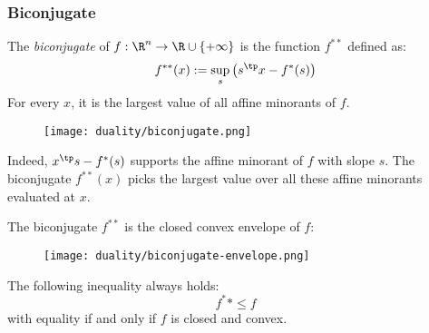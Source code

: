 \subsubsection{Biconjugate}
\begin{definition}[Biconjugate]
    The \emph{biconjugate} of $f:\R^n\to\R\cup\{+\infty\}$ is the function $f^{**}$ defined as:
    \begin{equation}
        \label{eq:biconjugate}
        f^{**}(x):=\sup_s\left(s^\tp x-f^*(s)\right)
    \end{equation}
    For every $x$, it is the largest value of all affine minorants of $f$.
    \begin{figure}[H]
        \centering
        \texttt{[image: duality/biconjugate.png]}
    \end{figure}
    Indeed, $x^\tp s-f^*(s)$ supports the affine minorant of $f$ with slope $s$. The biconjugate $f^{**}(x)$ picks the largest value over all these affine minorants evaluated at $x$.
\end{definition}

\begin{property}
    The biconjugate $f^{**}$ is the closed convex envelope of $f$:
    \begin{figure}[H]
        \centering
        \texttt{[image: duality/biconjugate-envelope.png]}
    \end{figure}
\end{property}
\begin{property}
    The following inequality always holds:
    \begin{equation*}
        f^**\leq f
    \end{equation*}
    with equality if and only if $f$ is closed and convex.
\end{property}